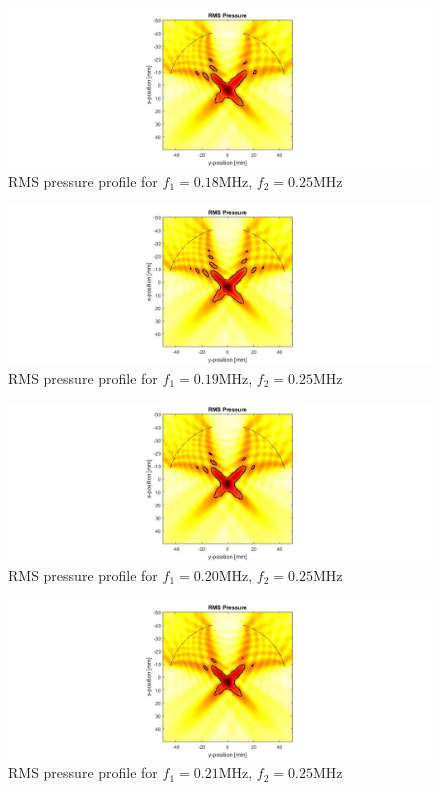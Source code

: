 \documentclass[10pt,a4paper]{article}
\begin{document}
\begin{figure}[!h]\label{f180kHz}
\hspace*{-5cm}                                                    
\includegraphics[scale=0.6]{f180kHz}
\caption{RMS pressure profile for $f_1 = 0.18$MHz, $f_2 = 0.25$MHz}
\end{figure}
\begin{figure}[!h]\label{f190kHz}
\hspace*{-5cm}                                                    
\includegraphics[scale=0.6]{f190kHz}
\caption{RMS pressure profile for $f_1 = 0.19$MHz, $f_2 = 0.25$MHz}
\end{figure}
\begin{figure}[!h]\label{f200kHz}
\hspace*{-5cm}                                                    
\includegraphics[scale=0.6]{f200kHz}
\caption{RMS pressure profile for $f_1 = 0.20$MHz, $f_2 = 0.25$MHz}
\end{figure}
\begin{figure}[!h]\label{f210kHz}
\hspace*{-5cm}                                                    
\includegraphics[scale=0.6]{f210kHz}
\caption{RMS pressure profile for $f_1 = 0.21$MHz, $f_2 = 0.25$MHz}
\end{figure}
\end{document}
